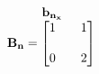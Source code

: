 \documentclass[preview]{standalone}
\begin{document}
\begin{align*}
\begin{array}{c}\begin{matrix}\hspace{1cm} \mathbf{b_{n_x}}  \quad \hspace{0.6cm} \end{matrix} \\ \mathbf{B_n} = \begin{bmatrix} 1 & \quad 1 \\ \\0 &  \quad 2 \end{bmatrix} \end{array}
\end{align*}
\end{document}
